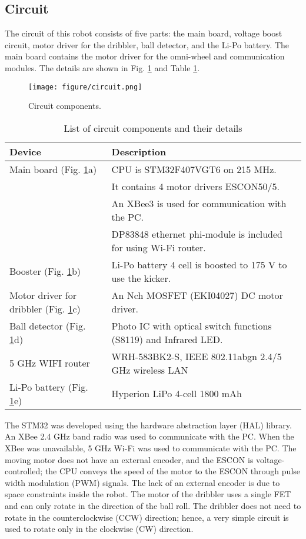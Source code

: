 \documentclass[]{llncs}
\begin{document}
\subsection{Circuit}
%
The circuit of this robot consists of five parts: the main board, voltage boost circuit, motor driver for the dribbler, ball detector, and the Li-Po battery.
%
The main board contains the motor driver for the omni-wheel and communication modules.
%
The details are shown in Fig. \ref{fig:circuit2019} and Table \ref{tab:circuit2019}.
%
\begin{figure}[ttbp]
    \centering
    \texttt{[image: figure/circuit.png]}
    \caption{Circuit components.}
    \label{fig:circuit2019}
\end{figure}
%
\begin{table}[htbp]
\centering
\caption{List of circuit components and their details}
\label{tab:circuit2019}
\begin{tabularx}{\linewidth}{X|X}
\hline
Device & Description \\\hline
Main board (Fig. \ref{fig:circuit2019}a) & CPU is STM32F407VGT6 on 215 MHz. \\
 & It contains 4 motor drivers ESCON50/5. \\
 & An XBee3 is used for communication with the PC. \\
 & DP83848 ethernet phi-module is included for using Wi-Fi router. \\
 \hline
 Booster (Fig. \ref{fig:circuit2019}b) & Li-Po battery 4 cell is boosted to 175 V to use the kicker. \\
\hline
Motor driver for dribbler (Fig. \ref{fig:circuit2019}c) & An Nch MOSFET (EKI04027) DC motor driver. \\
\hline
Ball detector (Fig. \ref{fig:circuit2019}d) & Photo IC with optical switch functions (S8119) and Infrared LED. \\
\hline
5 GHz WIFI router & WRH-583BK2-S, IEEE 802.11abgn 2.4/5 GHz wireless LAN \\
\hline
Li-Po battery (Fig. \ref{fig:circuit2019}e) & Hyperion LiPo 4-cell 1800 mAh \\
\hline
\end{tabularx}
\end{table}

The STM32 was developed using the hardware abstraction layer (HAL) library.
%
An XBee 2.4 GHz band radio was used to communicate with the PC.
%
When the XBee was unavailable, 5 GHz Wi-Fi was used to communicate with the PC.
%
The moving motor does not have an external encoder, and the ESCON is voltage-controlled; the CPU conveys the speed of the motor to the ESCON through pulse width modulation (PWM) signals.
%
The lack of an external encoder is due to space constraints inside the robot.
%
The motor of the dribbler uses a single FET and can only rotate in the direction of the ball roll.
%
The dribbler does not need to rotate in the counterclockwise (CCW) direction; hence, a very simple circuit is used to rotate only in the clockwise (CW) direction.
%
\end{document}
